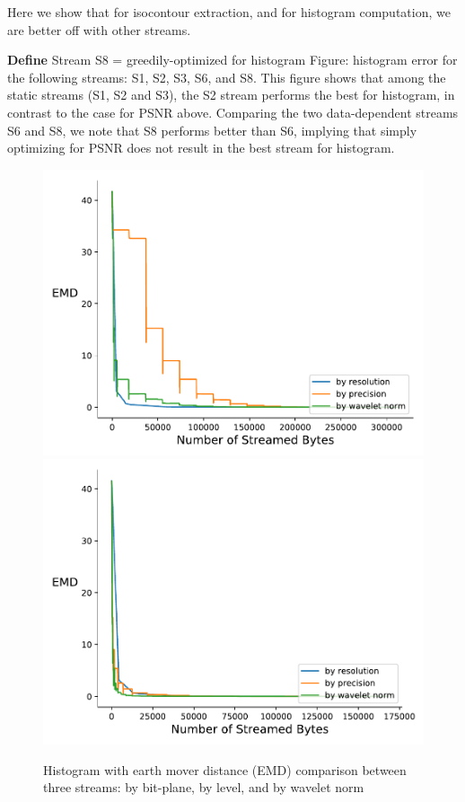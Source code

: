 Here we show that for isocontour extraction, and for histogram computation, we are better off with other streams.

\textbf{Define} Stream S8 = greedily-optimized for histogram
Figure: histogram error for the following streams: S1, S2, S3, S6, and S8. This figure shows that among the static streams (S1, S2 and S3), the S2 stream performs the best for histogram, in contrast to the case for PSNR above. Comparing the two data-dependent streams S6 and S8, we note that S8 performs better than S6, implying that simply optimizing for PSNR does not result in the best stream for histogram.

\begin{figure}[htb!]
	\centering
	{\includegraphics[width=0.4\linewidth]{img/independent/histogram-miranda-viscosity}}
	{\includegraphics[width=0.4\linewidth]{img/skip-zeros/histogram-miranda-viscosity}}
	\caption {Histogram with earth mover distance (EMD) comparison between three streams: by bit-plane, by level, and by wavelet norm}
	\label{fig:histogram_traditional_vs_by_norm_viscosity}
\end{figure}

